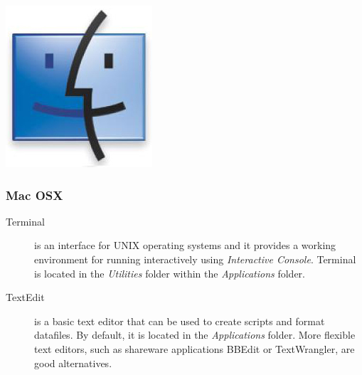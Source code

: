 \begin{flushleft}
	\begin{minipage}[c]{0.074\textwidth}
   		\includegraphics[width=\textwidth]{figures/figlogomac.jpg}
	\end{minipage}
	\quad
	\begin{minipage}[t]{0.88\textwidth}
	   	\subsubsection{Mac OSX}
	\end{minipage}
			\begin{description}
				\item[Terminal]  is an interface for UNIX operating systems and it
				provides a working environment  for running \poy interactively using \poy \emph{Interactive Console}. Terminal is located in the \emph{Utilities} folder within
				the \emph{Applications} folder.
				\item[TextEdit] is a basic text editor that can be used to create \poy
				scripts and format datafiles. By default, it is located in the
				\emph{Applications} folder. More flexible text editors, such as
				shareware applications BBEdit or TextWrangler, are good alternatives.
			\end{description}		


\end{flushleft}
